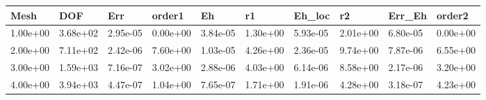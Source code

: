 \begin{tabular}{llllllllll}
Mesh & DOF & Err & order1 & Eh & r1 & Eh_loc & r2 & Err_Eh & order2 \\ 
\hline 
1.00e+00 & 3.68e+02 & 2.95e-05 & 0.00e+00 & 3.84e-05 & 1.30e+00 & 5.93e-05 & 2.01e+00 & 6.80e-05 & 0.00e+00 \\ 
2.00e+00 & 7.11e+02 & 2.42e-06 & 7.60e+00 & 1.03e-05 & 4.26e+00 & 2.36e-05 & 9.74e+00 & 7.87e-06 & 6.55e+00 \\ 
3.00e+00 & 1.59e+03 & 7.16e-07 & 3.02e+00 & 2.88e-06 & 4.03e+00 & 6.14e-06 & 8.58e+00 & 2.17e-06 & 3.20e+00 \\ 
4.00e+00 & 3.94e+03 & 4.47e-07 & 1.04e+00 & 7.65e-07 & 1.71e+00 & 1.91e-06 & 4.28e+00 & 3.18e-07 & 4.23e+00 \\ 
\hline 
\end{tabular}
